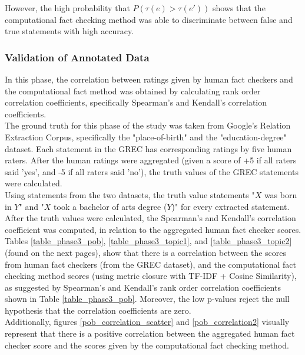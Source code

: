\documentclass[10pt,11pt,12pt,oneside]{book}
\begin{document}
However, the high probability that $ P (\tau (e) > \tau (e \prime)) $ shows that the computational fact checking method was able to discriminate between false and true statements with high accuracy.
\newpage
\subsubsection{Validation of Annotated Data}
In this phase, the correlation between ratings given by human fact checkers and the computational fact method was obtained by calculating rank order correlation coefficients, specifically Spearman's and Kendall's correlation coefficients.\\

The ground truth for this phase of the study was taken from Google's Relation Extraction Corpus, specifically the "place-of-birth" and the "education-degree" dataset. Each statement in the GREC has corresponding ratings by five human raters. After the human ratings were aggregated (given a score of +5 if all raters said 'yes', and -5 if all raters said 'no'), the truth values of the GREC statements were calculated.\\

Using statements from the two datasets, the truth value statements "$X$ was born in $Y$" and "$X$ took a bachelor of arts degree ($Y$)" for every extracted statement. After the truth values were calculated, the Spearman's and Kendall's correlation coefficient was computed, in relation to the aggregated human fact checker scores. \\

Tables \ref{table_phase3_pob}, \ref{table_phase3_topic1}, and \ref{table_phase3_topic2} (found on the next pages), show that there is a correlation between the scores from human fact checkers (from the GREC dataset), and the computational fact checking method scores (using metric closure with TF-IDF + Cosine Similarity), as suggested by Spearman's and Kendall's rank order correlation coefficients shown in Table \ref{table_phase3_pob}. Moreover, the low p-values reject the null hypothesis that the correlation coefficients are zero. \\

Additionally, figures \ref{pob_correlation_scatter} and \ref{pob_correlation2} visually represent that there is a positive correlation between the aggregated human fact checker score and the scores given by the computational fact checking method.\\
\end{document}
